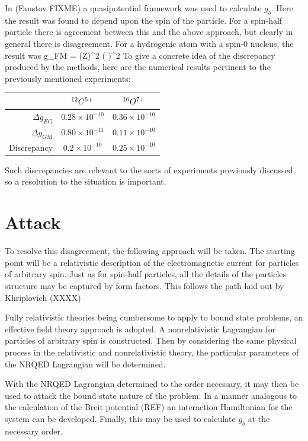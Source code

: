 In (Faustov FIXME)  a quasipotential framework was used to calculate $g_b$.  Here the result was found to depend upon the spin of the particle.  For a spin-half particle there is agreement between this and the above approach, but clearly in general there is disagreement.   For a hydrogenic atom with a spin-0 nucleus, the result was
\beq
	\Delta g_{FM} =  (Z\alpha)^2 \left(  \right )^2
\eeq
To give a concrete idea of the discrepancy produced by the methods, here are the numerical results pertinent to the previously mentioned experiments:  
\begin{center}
\begin{tabular}{r c c}
 					&	$^{12}C^{5+}$						&	 $^{16}O^{7+}$	\\	\hline
 $\Delta g_{EG}$		&	$ 0.28 \times 10^{-10}$ 	&	$ 0.36 \times 10^{-10}$	\\
 $\Delta g_{GM}$		&	$ 0.80 \times 10^{-11}$		&	$ 0.11 \times 10^{-10}$	\\
 Discrepancy			&	$ 0.2 \times 10^{-10}$		&	$ 0.25\times 10^{-10}$	\\
\end{tabular}
\end{center}

Such discrepancies are relevant to the sorts of experiments previously discussed, so a resolution to the situation is important.

\section{Attack}

To resolve this disagreement, the following approach will be taken.  The starting point will be a relativistic description of the electromagnetic current for particles of arbitrary spin.  Just as for spin-half particles, all the details of the particles structure may be captured by form factors.  This follows the path laid out by Khriplovich (XXXX)

Fully relativistic theories being cumbersome to apply to bound state problems, an effective field theory approach is adopted.  A nonrelativistic Lagrangian for particles of arbitrary spin is constructed.  Then by considering the same physical process in the relativistic and nonrelativistic theory, the particular parameters of the NRQED Lagrangian will be determined.

With the NRQED Lagrangian determined to the order necessary, it may then be used to attack the bound state nature of the problem.  In a manner analogous to the calculation of the Breit potential (REF) an interaction Hamiltonian for the system can be developed.  Finally, this may be used to calculate $g_b$ at the necessary order.





